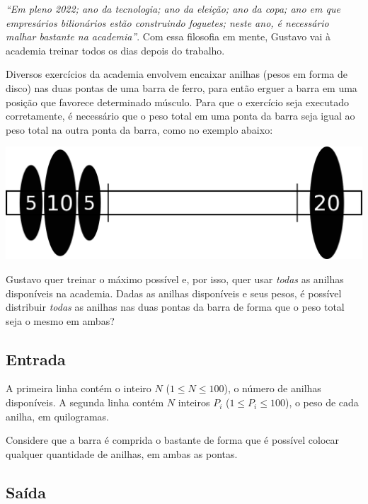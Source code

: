 \vspace{-0.4cm}
\textit{``Em pleno 2022; ano da tecnologia; ano da
eleição; ano da copa; ano em que empresários bilionários estão construindo
    foguetes; neste ano, é
necessário malhar bastante na academia''}. Com essa filosofia em mente, Gustavo vai
à academia treinar todos os dias depois do trabalho.

Diversos exercícios da academia envolvem encaixar anilhas (pesos em forma de
disco) nas duas pontas de uma barra de ferro, para então erguer a barra em uma
posição que favorece determinado músculo.
Para que o exercício seja executado corretamente, é necessário que o peso total
em uma ponta da barra seja igual ao peso total na outra ponta da barra, como no
exemplo abaixo:

\vspace{-0.4cm}
\begin{center}
    \includegraphics[scale=0.5]{pesos/pesos.png}
\end{center}

\vspace{-0.5cm}
Gustavo quer treinar o máximo possível e, por isso, quer usar
\textit{todas} as anilhas disponíveis na academia.
Dadas as anilhas disponíveis e seus pesos, é possível distribuir \textit{todas}
as anilhas nas duas pontas da barra de forma que o peso total seja o mesmo em ambas?

\subsection*{Entrada}

A primeira linha contém o inteiro $N$ ($1 \leq N \leq 100$), o número de
anilhas disponíveis. A segunda linha contém $N$ inteiros $P_i$ ($1 \leq P_i \leq 100$), o
peso de cada anilha, em quilogramas.

Considere que a barra é comprida o bastante de forma que é possível colocar
qualquer quantidade de anilhas, em ambas as pontas.

\subsection*{Saída}

